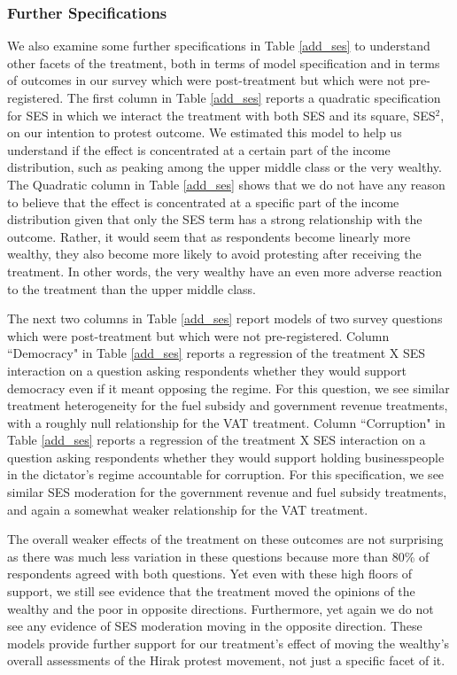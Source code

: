 \documentclass[12pt, letterpaper]{article}
\begin{document}
\subsubsection*{Further Specifications}


We also examine some further specifications in Table \ref{add_ses} to understand other facets of the treatment, both in terms of model specification and in terms of outcomes in our survey which were post-treatment but which were not pre-registered. The first column in Table \ref{add_ses} reports a quadratic specification for SES in which we interact the treatment with both SES and its square, SES$^2$, on our intention to protest outcome. We estimated this model to help us understand if the effect is concentrated at a certain part of the income distribution, such as peaking among the upper middle class or the very wealthy. The Quadratic column in  Table \ref{add_ses} shows that we do not have any reason to believe that the effect is concentrated at a specific part of the income distribution given that only the SES term has a strong relationship with the outcome. Rather, it would seem that as respondents become linearly more wealthy, they also become more likely to avoid protesting after receiving the treatment. In other words, the very wealthy have an even more adverse reaction to the treatment than the upper middle class.



The next two columns in Table \ref{add_ses} report models of two survey questions which were post-treatment but which were not pre-registered. Column ``Democracy" in Table \ref{add_ses} reports a regression of the treatment X SES interaction on a question asking respondents whether they would support democracy even if it meant opposing the regime. For this question, we see similar treatment heterogeneity for the fuel subsidy and government revenue treatments, with a roughly null relationship for the VAT treatment. Column ``Corruption" in Table \ref{add_ses} reports a regression of the treatment X SES interaction on a question asking respondents whether they would support holding businesspeople in the dictator's regime accountable for corruption. For this specification, we see similar SES moderation for the government revenue and fuel subsidy treatments, and again a somewhat weaker relationship for the VAT treatment. 

The overall weaker effects of the treatment on these outcomes are not surprising as there was much less variation in these questions because more than 80\% of respondents agreed with both questions. Yet even with these high floors of support, we still see evidence that the treatment moved the opinions of the wealthy and the poor in opposite directions. Furthermore, yet again we do not see any evidence of SES moderation moving in the opposite direction. These models provide further support for our treatment's effect of moving the wealthy's overall assessments of the Hirak protest movement, not just a specific facet of it.
\end{document}
